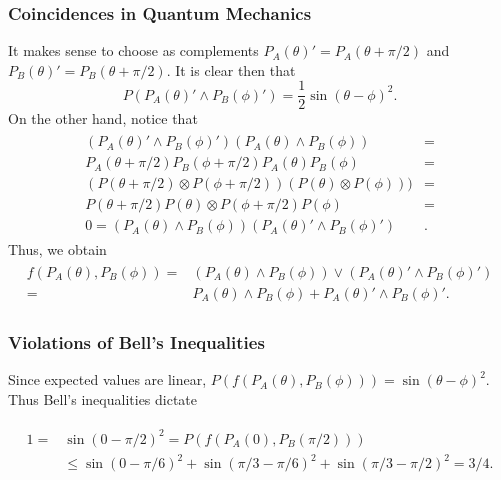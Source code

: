 \documentclass{beamer}
\begin{document}
\begin{frame}

	\frametitle{Coincidences in Quantum Mechanics}
	
	It makes sense to choose as complements $P_A(\theta)'=P_A(\theta+\pi/2)$ and $P_B(\theta)'=P_B(\theta+\pi/2)$. It is clear then that 
	\begin{equation}
		P(P_A(\theta)'\wedge P_B(\phi)')=\frac{1}{2}\sin(\theta-\phi)^2.
	\end{equation}
	On the other hand, notice that
	\begin{align}
	\begin{split}
		(P_A(\theta)'\wedge P_B(\phi)')(P_A(\theta)\wedge P_B(\phi))&=\\
		P_A(\theta+\pi/2)P_B(\phi+\pi/2)P_A(\theta)P_B(\phi)&=\\
		(P(\theta+\pi/2)\otimes P(\phi+\pi/2))(P(\theta)\otimes P(\phi)))&=\\
		P(\theta+\pi/2)P(\theta)\otimes P(\phi+\pi/2)P(\phi)&=\\
		0=(P_A(\theta)\wedge P_B(\phi))(P_A(\theta)'\wedge P_B(\phi)')&.
	\end{split}
	\end{align}	 
	Thus, we obtain
	\begin{align}
	\begin{split}
	f(P_A(\theta),P_B(\phi))=&(P_A(\theta)\wedge P_B(\phi))\vee(P_A(\theta)'\wedge P_B(\phi)')\\
	=&P_A(\theta)\wedge P_B(\phi)+P_A(\theta)'\wedge P_B(\phi)'.
	\end{split}
	\end{align}

\end{frame}

\begin{frame}

	\frametitle{Violations of Bell's Inequalities}

	Since expected values are linear, $P(f(P_A(\theta),P_B(\phi)))=\sin(\theta-\phi)^2$. Thus Bell's inequalities dictate
	
	\begin{align}
	\begin{split}
	1=&\sin(0-\pi/2)^2=P(f(P_A(0),P_B(\pi/2)))\\
	&\leq\sin(0-\pi/6)^2+\sin(\pi/3-\pi/6)^2+\sin(\pi/3-\pi/2)^2=3/4.
	\end{split}
	\end{align}

\end{frame}
\end{document}

